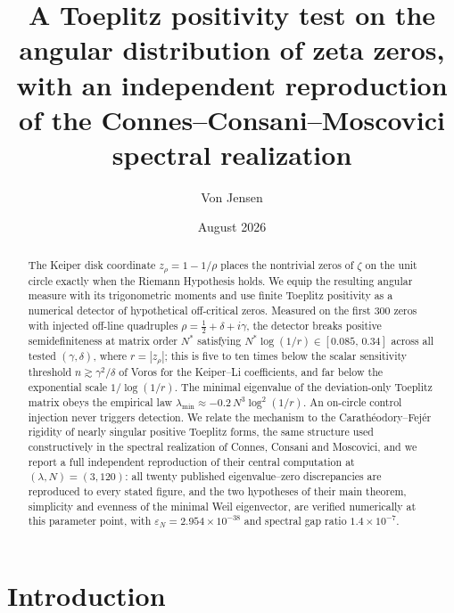 \documentclass[11pt,oneside]{article}
\title{A Toeplitz positivity test on the angular distribution of zeta zeros,\\
with an independent reproduction of the Connes--Consani--Moscovici\\ spectral realization}
\author{Von Jensen}
\date{August 2026}
\theoremstyle{remark}
\begin{document}
\maketitle

\begin{abstract}
The Keiper disk coordinate $z_\rho = 1 - 1/\rho$ places the nontrivial zeros of
$\zeta$ on the unit circle exactly when the Riemann Hypothesis holds. We equip
the resulting angular measure with its trigonometric moments and use finite
Toeplitz positivity as a numerical detector of hypothetical off-critical zeros.
Measured on the first $300$ zeros with injected off-line quadruples
$\rho = \tfrac12 + \delta + i\gamma$, the detector breaks positive
semidefiniteness at matrix order $N^{*}$ satisfying
$N^{*}\log(1/r) \in [0.085,\,0.34]$ across all tested $(\gamma,\delta)$, where
$r = |z_\rho|$; this is five to ten times below the scalar sensitivity threshold
$n \gtrsim \gamma^{2}/\delta$ of Voros for the Keiper--Li coefficients, and far
below the exponential scale $1/\log(1/r)$. The minimal eigenvalue of the
deviation-only Toeplitz matrix obeys the empirical law
$\lambda_{\min} \approx -0.2\,N^{3}\log^{2}(1/r)$. An on-circle control
injection never triggers detection. We relate the mechanism to the
Carath\'eodory--Fej\'er rigidity of nearly singular positive Toeplitz forms, the
same structure used constructively in the spectral realization of
Connes, Consani and Moscovici, and we report a full independent reproduction of
their central computation at $(\lambda, N) = (3, 120)$: all twenty published
eigenvalue--zero discrepancies are reproduced to every stated figure, and the
two hypotheses of their main theorem, simplicity and evenness of the minimal
Weil eigenvector, are verified numerically at this parameter point, with
$\varepsilon_N = 2.954\times 10^{-38}$ and spectral gap ratio
$1.4\times 10^{-7}$.
\end{abstract}

\section{Introduction}
\end{document}
